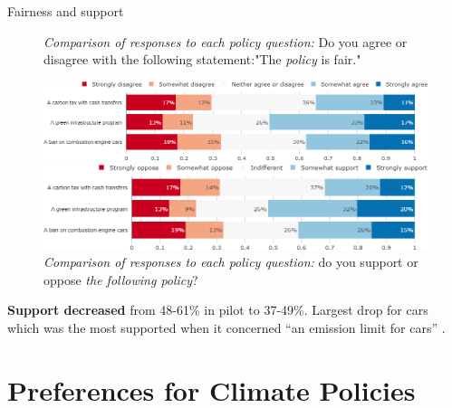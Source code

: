 \documentclass[aspectratio=169,9pt,dvipsnames]{beamer}
\begin{document}
\begin{frame}{Fairness and support}%
\begin{figure}[h!]
\vspace{-.1cm}
\centering
\caption{\textit{Comparison of responses to each policy question:} Do you agree or disagree with the following statement:"The \textit{policy} is fair."}
\includegraphics[width=.8\textwidth]{../figures/US/policies_fair_US.png}
\vspace{-.1cm}
\centering
\caption{\textit{Comparison of responses to each policy question:} do you support or oppose \textit{the following policy}?}
\includegraphics[width=.8\textwidth]{../figures/US/policies_support_US.png}
\end{figure}

\textbf{Support decreased} from 48-61\% in pilot to 37-49\%. Largest drop for cars which was the most supported when it concerned ``an emission limit for cars'' .
\end{frame}

\section{Preferences for Climate Policies}
\end{document}

